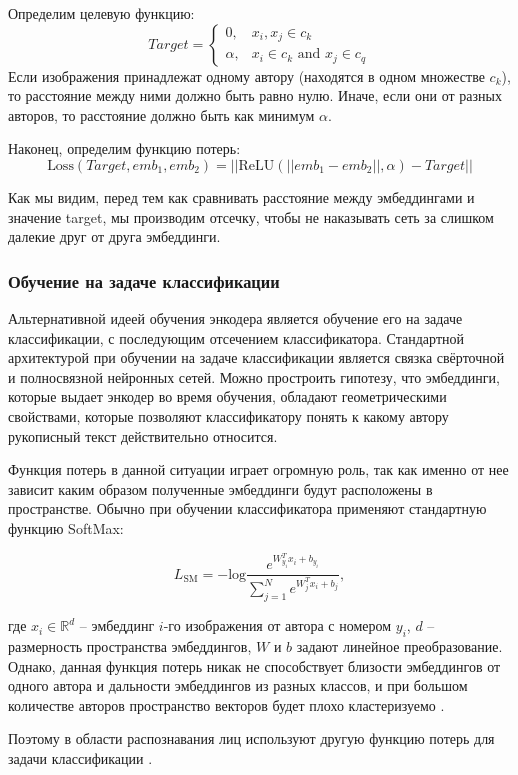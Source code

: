 \noindent
Определим целевую функцию:
$$
Target =
\begin{cases}
    0,& x_i, x_j \in c_k \\
    \alpha,& x_i \in c_k \text{ and } x_j \in c_q
\end{cases}
$$
Если изображения принадлежат одному автору (находятся в одном множестве $c_k$), то расстояние между ними должно быть равно нулю. Иначе, если они от разных авторов, то расстояние должно быть как минимум $\alpha$. 

\noindent
Наконец, определим функцию потерь:
$$\text{Loss}(Target, emb_1, emb_2) = ||\text{ReLU}(|| emb_1 - emb_2 ||, \alpha) - Target||$$

\noindent
Как мы видим, перед тем как сравнивать расстояние между эмбеддингами и значение target, мы производим отсечку, чтобы не наказывать сеть за слишком далекие друг от друга эмбеддинги.

\subsubsection{Обучение на задаче классификации}

Альтернативной идеей обучения энкодера является обучение его на задаче классификации, с последующим отсечением классификатора. Стандартной архитектурой при обучении на задаче классификации является связка свёрточной и полносвязной нейронных сетей. Можно простроить гипотезу, что эмбеддинги, которые выдает энкодер во время обучения, обладают геометрическими свойствами, которые позволяют классификатору понять к какому автору рукописный текст действительно относится.

Функция потерь в данной ситуации играет огромную роль, так как именно от нее зависит каким образом полученные эмбеддинги будут расположены в пространстве. Обычно при обучении классификатора применяют стандартную функцию SoftMax:

$$
L_{\text{SM}} = -\text{log} \frac{e^{W_{y_i}^T x_i + b_{y_i}}}{\sum_{j=1}^{N} e^{W_{j}^T x_i + b_{j}}},
$$
\smallskip

\noindent
где $x_i \in \mathbb{R}^d$ -- эмбеддинг $i$-го изображения от автора с номером $y_i$, $d$ -- размерность пространства эмбеддингов, $W$ и $b$ задают линейное преобразование. Однако, данная функция потерь никак не способствует близости эмбеддингов от одного автора и дальности эмбеддингов из разных классов, и при большом количестве авторов пространство векторов будет плохо кластеризуемо \cite{arcface}. 

Поэтому в области распознавания лиц используют другую функцию потерь для задачи классификации \cite{arcface}. 

